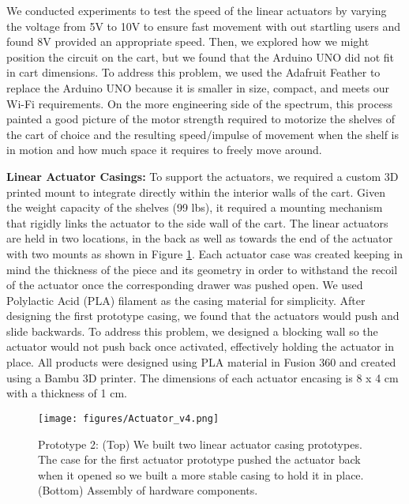 We conducted experiments to test the speed of the linear actuators by varying the voltage from 5V to 10V to ensure fast movement with out startling users and found 8V provided an appropriate speed. %
Then, we explored how we might position the circuit on the cart, but we found that the Arduino UNO did not fit in cart dimensions.
To address this problem, we used the Adafruit Feather to replace the Arduino UNO because it is smaller in size, compact, and meets our Wi-Fi requirements.
On the more engineering side of the spectrum, this process painted a good picture of the motor strength required to motorize the shelves of the cart of choice and the resulting speed/impulse of movement when the shelf is in motion and how much space it requires to freely move around. 







\textbf{Linear Actuator Casings:} To support the actuators, we required a custom 3D printed mount to integrate directly within the interior walls of the cart. %
Given the weight capacity of the shelves (99 lbs), it required a mounting mechanism that rigidly links the actuator to the side wall of the cart.
The linear actuators are held in two locations, in the back as well as towards the end of the actuator with two mounts as shown in Figure \ref{fig:actuator}.
Each actuator case was created keeping in mind the thickness of the piece and its geometry in order to withstand the recoil of the actuator once the corresponding drawer was pushed open. 
We used Polylactic Acid (PLA) filament as the casing material for simplicity.
After designing the first prototype casing, we found that the actuators would push and slide backwards. 
To address this problem, we designed a blocking wall so the actuator would not push back once activated, effectively holding the actuator in place. 
All products were designed using PLA material in Fusion 360 and created using a Bambu 3D printer. 
The dimensions of each actuator encasing is 8 x 4 cm with a thickness of 1 cm. 



\begin{figure}[t] 
\centering 
\texttt{[image: figures/Actuator\_v4.png]} 
\caption{Prototype 2: (Top) We built two linear actuator casing prototypes. The case for the first actuator prototype pushed the actuator back when it opened so we built a more stable casing to hold it in place. (Bottom) Assembly of hardware components.} 
\label{fig:actuator}
\end{figure}

